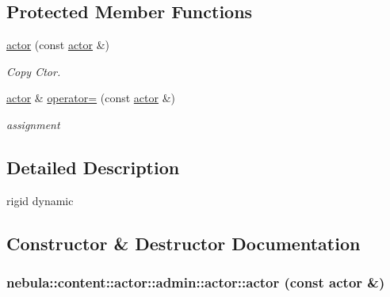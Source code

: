 \subsection*{Protected Member Functions}
\begin{DoxyCompactItemize}
\item 
\hyperlink{classnebula_1_1content_1_1actor_1_1admin_1_1actor_a9869e8cd532d16d0fd2bd354ba973bfe}{actor} (const \hyperlink{classnebula_1_1content_1_1actor_1_1admin_1_1actor}{actor} \&)
\begin{DoxyCompactList}\small\item\em Copy Ctor. \item\end{DoxyCompactList}\item 
\hyperlink{classnebula_1_1content_1_1actor_1_1admin_1_1actor}{actor} \& \hyperlink{classnebula_1_1content_1_1actor_1_1admin_1_1actor_a1fa2018d91941548c260422e1b867ba5}{operator=} (const \hyperlink{classnebula_1_1content_1_1actor_1_1admin_1_1actor}{actor} \&)
\begin{DoxyCompactList}\small\item\em assignment \item\end{DoxyCompactList}\end{DoxyCompactItemize}


\subsection{Detailed Description}
rigid dynamic 

\subsection{Constructor \& Destructor Documentation}
\hypertarget{classnebula_1_1content_1_1actor_1_1admin_1_1actor_a9869e8cd532d16d0fd2bd354ba973bfe}{
\subsubsection[{actor}]{\setlength{\rightskip}{0pt plus 5cm}nebula::content::actor::admin::actor::actor (const {\bf actor} \&)}}
\label{classnebula_1_1content_1_1actor_1_1admin_1_1actor_a9869e8cd532d16d0fd2bd354ba973bfe}


